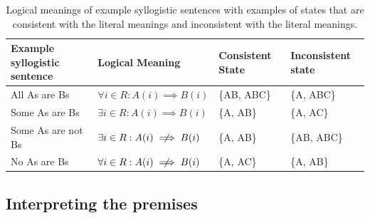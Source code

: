 \documentclass[floatsintext, doc]{apa6}
\begin{document}
\begin{table}[b]
\begin{tabular}{@{}llll@{}}
\toprule
Example syllogistic sentence & Logical Meaning                                                                       & Consistent State & Inconsistent state \\ \midrule
All As are Bs                                      & $\forall i \in R: A(i) \implies B(i) $ & \{AB, ABC\}                           & \{A, ABC\}                              \\
Some As are Bs                                     & $\exists i \in R: A(i) \implies B(i) $ & \{A, AB\}                             & \{A, AC\}                               \\
Some As are not Bs                                 & $\exists i \in R: A(i)  \centernot \implies B(i) $ & \{A, AB\}                             & \{AB, ABC\}                             \\
No As are Bs                                       & $\forall i \in R: A(i) \centernot \implies B(i) $  & \{A, AC\}                             & \{A, AB\} \\ \bottomrule
\end{tabular}
\caption{Logical meanings of example syllogistic sentences with examples of states that are consistent with the literal meanings and inconsistent with the literal meanings.}
\label{tab:sem}
\end{table}

\subsection{Interpreting the premises}
\end{document}
